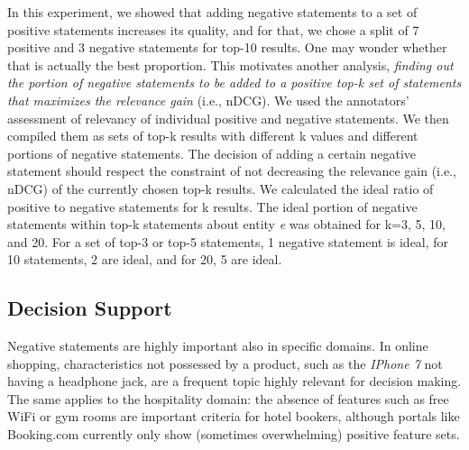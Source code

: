 \begin{table}
  \caption{Positive-only vs.\ positive and negative statements.}
  \label{tab:posneg}
  \center
  \begin{centering}
  \end{centering}
\end{table}


In this experiment, we showed that adding negative statements to a set of positive statements increases its quality, and for that, we chose a split of 7 positive and 3 negative statements for top-10 results. One may wonder whether that is actually the best proportion. This motivates another analysis, \textit{finding out the portion of negative statements to be added to a positive top-k set of statements that maximizes the relevance gain} (i.e., nDCG). We used the annotators' assessment of relevancy of individual positive and negative statements. 
 We then compiled them as sets of top-k results with different k values and different portions of negative statements. The decision of adding a certain negative statement should respect the constraint of not decreasing the relevance gain (i.e., nDCG) of the currently chosen top-k results. We calculated the ideal ratio of positive to negative statements for k results. The ideal portion of negative statements within top-k statements about entity \textit{e} was obtained for k=3, 5, 10, and 20. For a set of top-3 or top-5 statements, 1 negative statement is ideal, for 10 statements, 2 are ideal, and for 20, 5 are ideal.

\subsection{Decision Support}
Negative statements are highly important also in specific domains. In online shopping, characteristics not possessed by a product, such as the \textit{IPhone 7} not having a headphone jack, are a frequent topic highly relevant for decision making. The same applies to the hospitality domain: the absence of features such as free WiFi or gym rooms are important criteria for hotel bookers, although portals like Booking.com currently only show (sometimes overwhelming) positive feature sets.

